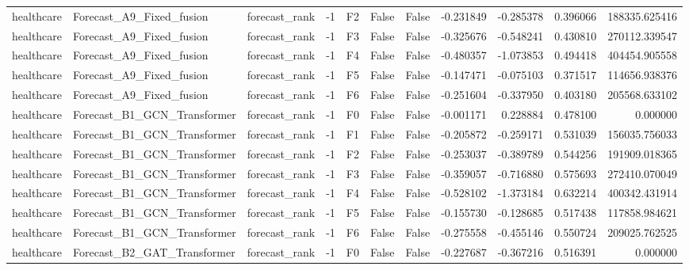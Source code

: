 \begin{tabular}{lllrlllrrrr}
healthcare &     Forecast\_A9\_Fixed\_fusion & forecast\_rank &    -1 &  F2 &           False &            False & -0.231849 & -0.285378 & 0.396066 &    188335.625416 \\
healthcare &     Forecast\_A9\_Fixed\_fusion & forecast\_rank &    -1 &  F3 &           False &            False & -0.325676 & -0.548241 & 0.430810 &    270112.339547 \\
healthcare &     Forecast\_A9\_Fixed\_fusion & forecast\_rank &    -1 &  F4 &           False &            False & -0.480357 & -1.073853 & 0.494418 &    404454.905558 \\
healthcare &     Forecast\_A9\_Fixed\_fusion & forecast\_rank &    -1 &  F5 &           False &            False & -0.147471 & -0.075103 & 0.371517 &    114656.938376 \\
healthcare &     Forecast\_A9\_Fixed\_fusion & forecast\_rank &    -1 &  F6 &           False &            False & -0.251604 & -0.337950 & 0.403180 &    205568.633102 \\
healthcare &  Forecast\_B1\_GCN\_Transformer & forecast\_rank &    -1 &  F0 &           False &            False & -0.001171 &  0.228884 & 0.478100 &         0.000000 \\
healthcare &  Forecast\_B1\_GCN\_Transformer & forecast\_rank &    -1 &  F1 &           False &            False & -0.205872 & -0.259171 & 0.531039 &    156035.756033 \\
healthcare &  Forecast\_B1\_GCN\_Transformer & forecast\_rank &    -1 &  F2 &           False &            False & -0.253037 & -0.389789 & 0.544256 &    191909.018365 \\
healthcare &  Forecast\_B1\_GCN\_Transformer & forecast\_rank &    -1 &  F3 &           False &            False & -0.359057 & -0.716880 & 0.575693 &    272410.070049 \\
healthcare &  Forecast\_B1\_GCN\_Transformer & forecast\_rank &    -1 &  F4 &           False &            False & -0.528102 & -1.373184 & 0.632214 &    400342.431914 \\
healthcare &  Forecast\_B1\_GCN\_Transformer & forecast\_rank &    -1 &  F5 &           False &            False & -0.155730 & -0.128685 & 0.517438 &    117858.984621 \\
healthcare &  Forecast\_B1\_GCN\_Transformer & forecast\_rank &    -1 &  F6 &           False &            False & -0.275558 & -0.455146 & 0.550724 &    209025.762525 \\
healthcare &  Forecast\_B2\_GAT\_Transformer & forecast\_rank &    -1 &  F0 &           False &            False & -0.227687 & -0.367216 & 0.516391 &         0.000000 \\

\end{tabular}
